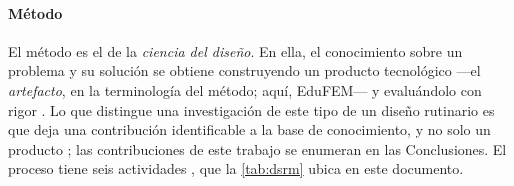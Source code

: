 \paragraph{Método} El método es el de la \emph{ciencia del diseño}. En ella, el conocimiento sobre un problema y su solución se obtiene construyendo un producto tecnológico —el \emph{artefacto}, en la terminología del método; aquí, EduFEM— y evaluándolo con rigor \autocite[p.~75]{hevner2004design}. Lo que distingue una investigación de este tipo de un diseño rutinario es que deja una contribución identificable a la base de conocimiento, y no solo un producto \autocite[p.~81]{hevner2004design}; las contribuciones de este trabajo se enumeran en las Conclusiones. El proceso tiene seis actividades \autocite[pp.~52-56]{peffers2007dsrm}, que la \autoref{tab:dsrm} ubica en este documento.

